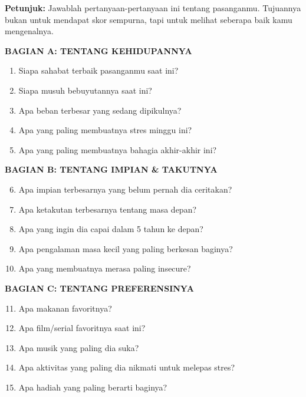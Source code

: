 \begin{exercisebox}
\textbf{Petunjuk:} Jawablah pertanyaan-pertanyaan ini tentang pasanganmu. Tujuannya bukan untuk mendapat skor sempurna, tapi untuk melihat seberapa baik kamu mengenalnya.

\vspace{0.3cm}
\textbf{BAGIAN A: TENTANG KEHIDUPANNYA}

\begin{enumerate}[itemsep=0.2cm]
    \item Siapa sahabat terbaik pasanganmu saat ini? \hrulefill
    \item Siapa musuh bebuyutannya saat ini? \hrulefill
    \item Apa beban terbesar yang sedang dipikulnya? \hrulefill
    \item Apa yang paling membuatnya stres minggu ini? \hrulefill
    \item Apa yang paling membuatnya bahagia akhir-akhir ini? \hrulefill
\end{enumerate}

\textbf{BAGIAN B: TENTANG IMPIAN \& TAKUTNYA}

\begin{enumerate}[itemsep=0.2cm]
    \setcounter{enumi}{5}
    \item Apa impian terbesarnya yang belum pernah dia ceritakan? \hrulefill
    \item Apa ketakutan terbesarnya tentang masa depan? \hrulefill
    \item Apa yang ingin dia capai dalam 5 tahun ke depan? \hrulefill
    \item Apa pengalaman masa kecil yang paling berkesan baginya? \hrulefill
    \item Apa yang membuatnya merasa paling insecure? \hrulefill
\end{enumerate}

\textbf{BAGIAN C: TENTANG PREFERENSINYA}

\begin{enumerate}[itemsep=0.2cm]
    \setcounter{enumi}{10}
    \item Apa makanan favoritnya? \hrulefill
    \item Apa film/serial favoritnya saat ini? \hrulefill
    \item Apa musik yang paling dia suka? \hrulefill
    \item Apa aktivitas yang paling dia nikmati untuk melepas stres? \hrulefill
    \item Apa hadiah yang paling berarti baginya? \hrulefill
\end{enumerate}


\end{exercisebox}
